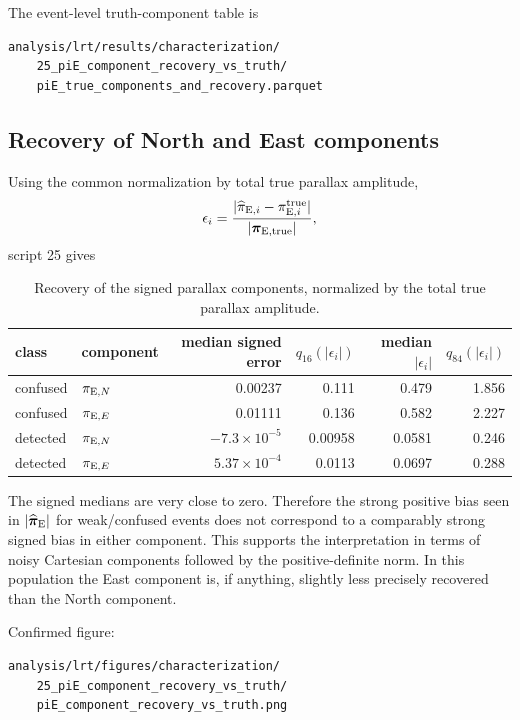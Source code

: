 \documentclass[11pt,a4paper]{article}
\newcommand{\pen}{\pi_{{\rm E},N}}
\newcommand{\pee}{\pi_{{\rm E},E}}
\begin{document}
The event-level truth-component table is
\begin{verbatim}
analysis/lrt/results/characterization/
    25_piE_component_recovery_vs_truth/
    piE_true_components_and_recovery.parquet
\end{verbatim}

\subsection{Recovery of North and East components}

Using the common normalization by total true parallax amplitude,
\begin{equation}
    \epsilon_i
    =
    \frac{
      |\widehat{\pi}_{{\rm E},i}
      -\pi_{{\rm E},i}^{\rm true}|
    }{
      |\boldsymbol{\pi}_{\rm E,true}|
    },
\end{equation}
script 25 gives
\begin{table}[H]
\centering
\begin{tabular}{llrrrr}
\toprule
class & component &
median signed error &
$q_{16}(|\epsilon_i|)$ &
median $|\epsilon_i|$ &
$q_{84}(|\epsilon_i|)$\\
\midrule
confused & $\pen$ & 0.00237 & 0.111 & 0.479 & 1.856\\
confused & $\pee$ & 0.01111 & 0.136 & 0.582 & 2.227\\
detected & $\pen$ & $-7.3\times10^{-5}$ & 0.00958 & 0.0581 & 0.246\\
detected & $\pee$ & $5.37\times10^{-4}$ & 0.0113 & 0.0697 & 0.288\\
\bottomrule
\end{tabular}
\caption{Recovery of the signed parallax components, normalized by the total
true parallax amplitude.}
\end{table}

The signed medians are very close to zero.  Therefore the strong positive bias
seen in $|\widehat{\boldsymbol{\pi}}_{\rm E}|$ for weak/confused events does
not correspond to a comparably strong signed bias in either component.  This
supports the interpretation in terms of noisy Cartesian components followed by
the positive-definite norm.  In this population the East component is, if
anything, slightly less precisely recovered than the North component.

Confirmed figure:
\begin{verbatim}
analysis/lrt/figures/characterization/
    25_piE_component_recovery_vs_truth/
    piE_component_recovery_vs_truth.png
\end{verbatim}
\end{document}
